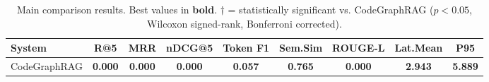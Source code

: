 \begin{table}[t]
\centering
\caption{Main comparison results. Best values in \textbf{bold}. 
$\dagger$ = statistically significant vs. CodeGraphRAG ($p < 0.05$, Wilcoxon signed-rank, Bonferroni corrected).}
\begin{tabular}{lcccccccc}
\toprule
System & R@5 & MRR & nDCG@5 & Token F1 & Sem.Sim & ROUGE-L & Lat.Mean & P95 \\
\midrule
CodeGraphRAG & \textbf{0.000} & \textbf{0.000} & \textbf{0.000} & \textbf{0.057} & \textbf{0.765} & \textbf{0.000} & \textbf{2.943} & \textbf{5.889} \\
\bottomrule
\end{tabular}
\end{table}